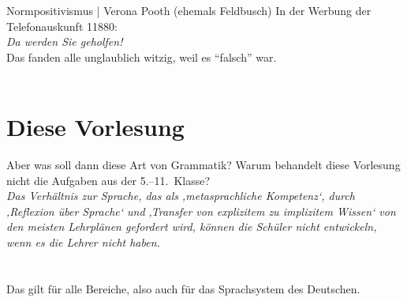 \begin{frame}
  {Normpositivismus | Verona Pooth (ehemals Feldbusch)}
  \onslide<+->
  \onslide<+->
  \centering 
  In der Werbung der Telefonauskunft 11880:\\
  \Zeile
  \onslide<+->
  \alert{\LARGE\textit{Da werden Sie geholfen!}}\\
  \onslide<+->
  \Zeile
  Das fanden alle unglaublich witzig, weil es "`falsch"' war.\\
  \onslide<+->
  \Zeile
  \centering 
  \\
  \onslide<+->
  \Halbzeile
\end{frame}




\section{Diese Vorlesung}

\begin{frame}
  {Aber was soll dann diese Art von Grammatik?}
  \onslide<+->
  \onslide<+->
  \alert{Warum behandelt diese Vorlesung nicht die Aufgaben aus der 5.--11.~Klasse?}\\
  \onslide<+->
  \Zeile
  \textit{Das Verhältnis zur Sprache, das als ‚metasprachliche Kompetenz‘, durch ‚Reflexion über Sprache‘ und ‚Transfer von explizitem zu implizitem Wissen‘ von den meisten Lehrplänen gefordert wird, können die Schüler nicht entwickeln, wenn es die Lehrer nicht haben.}\\
  \Viertelzeile
  \\
  \Doppelzeile 
  \centering
  \onslide<+->
  \\
  \Viertelzeile
  \onslide<+->
  \alert{Das gilt für alle Bereiche, also auch für das Sprachsystem des Deutschen.}
\end{frame}

